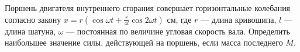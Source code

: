 Поршень двигателя внутреннего сгорания совершает горизонтальные колебания
согласно закону $x = r\left(\cos{\omega t} +
\frac{r}{4l}\cos{2\omega t}\right)$ см,
где $r$ --- длина кривошипа, $l$ --- длина шатуна,
$\omega$ --- постоянная по величине угловая скорость вала.
Определить наибольшее значение силы, действующей на поршень,
если масса последнего $M$.
